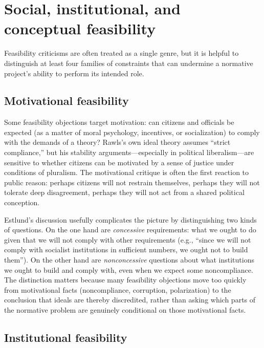 \documentclass[12pt]{report}
\begin{document}
\section{Social, institutional, and conceptual feasibility}\label{sec:feasibility-types}

Feasibility criticisms are often treated as a single genre, but it is helpful to distinguish at least four families of constraints that can undermine a normative project's ability to perform its intended role.

\subsection{Motivational feasibility}

Some feasibility objections target motivation: can citizens and officials be expected (as a matter of moral psychology, incentives, or socialization) to comply with the demands of a theory? Rawls's own ideal theory assumes ``strict compliance,'' but his stability arguments---especially in political liberalism---are sensitive to whether citizens can be motivated by a sense of justice under conditions of pluralism.\parencite[p.~1]{rawls1987overlapping} The motivational critique is often the first reaction to public reason: perhaps citizens will not restrain themselves, perhaps they will not tolerate deep disagreement, perhaps they will not act from a shared political conception.

Estlund's discussion usefully complicates the picture by distinguishing two kinds of questions. On the one hand are \emph{concessive} requirements: what we ought to do given that we will not comply with other requirements (e.g., ``since we will not comply with socialist institutions in sufficient numbers, we ought not to build them'').\parencite[p.~6]{estlund2019utopophobia} On the other hand are \emph{nonconcessive} questions about what institutions we ought to build and comply with, even when we expect some noncompliance.\parencite[p.~6]{estlund2019utopophobia} The distinction matters because many feasibility objections move too quickly from motivational facts (noncompliance, corruption, polarization) to the conclusion that ideals are thereby discredited, rather than asking which parts of the normative problem are genuinely conditional on those motivational facts.

\subsection{Institutional feasibility}
\end{document}
